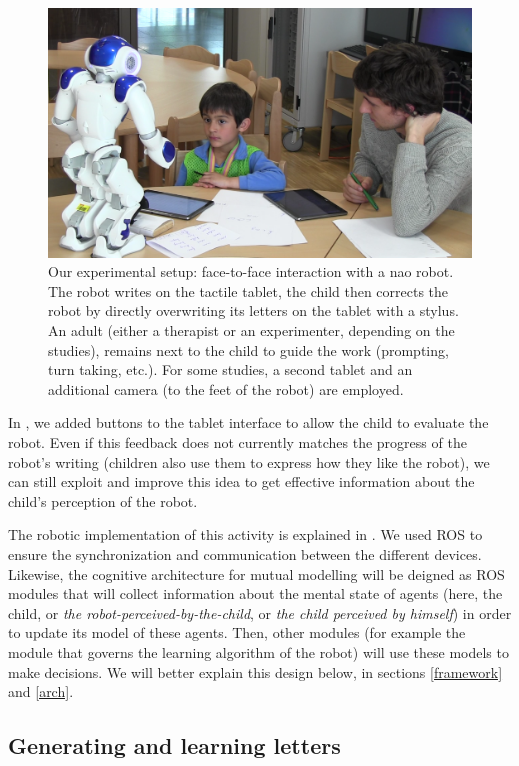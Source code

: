 \documentclass[10pt,a4paper]{article}
\begin{document}
   \begin{figure}
       \centering
       \includegraphics[width=0.6\columnwidth]{realSetup}
       \caption{\small Our experimental setup: face-to-face interaction with a {\sc
           nao} robot.  The robot writes on the tactile tablet, the child then
           corrects the robot by directly overwriting its letters on the tablet
           with a stylus. An adult (either a therapist or an experimenter,
           depending on the studies), remains next to the child to guide the work
           (prompting, turn taking, etc.). For some studies, a second tablet and an
           additional camera (to the feet of the robot) are employed.}

       \label{experimental_setup}
   \end{figure}
   
In \cite{jacq2016building}, we added buttons to the tablet interface to allow the child to evaluate the robot. Even if this feedback does not currently matches the progress of the robot's writing (children also use them to express how they like the robot), we can still exploit and improve this idea to get effective information about the child's perception of the robot.
   
The robotic implementation of this activity is explained in \cite{Hood}. We used ROS to ensure the synchronization and communication between the different devices. Likewise, the cognitive architecture for mutual modelling will be deigned as ROS modules that will collect information about the mental state of agents (here, the child, or \textit{the robot-perceived-by-the-child}, or \textit{the child perceived by himself}) in order to update its model of these agents. Then, other modules (for example the module that governs the learning algorithm of the robot) will use these models to make decisions. We will better explain this design below, in sections \ref{framework} and \ref{arch}.

\subsection{Generating and learning letters}
\end{document}
